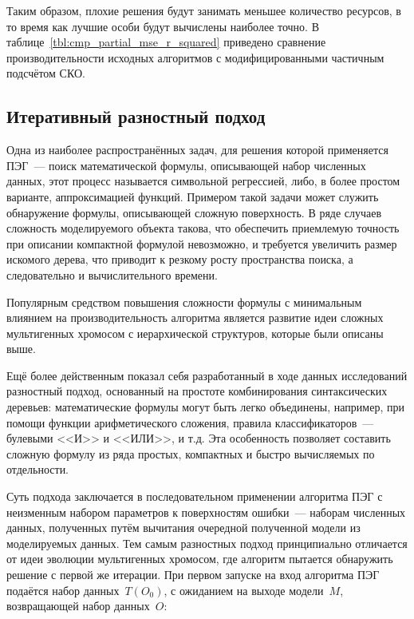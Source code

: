 Таким образом, плохие решения будут занимать меньшее количество ресурсов, в то время как лучшие особи будут вычислены наиболее точно. В таблице~\ref{tbl:cmp_partial_mse_r_squared} приведено сравнение производительности исходных алгоритмов с модифицированными частичным подсчётом СКО.






\subsection{Итеративный разностный подход}

Одна из наиболее распространённых задач, для решения которой применяется ПЭГ~--- поиск математической формулы, описывающей набор численных данных, этот процесс называется символьной регрессией, либо, в более простом варианте, аппроксимацией функций. Примером такой задачи может служить обнаружение формулы, описывающей сложную поверхность. В ряде случаев сложность моделируемого объекта такова, что обеспечить приемлемую точность при описании компактной формулой невозможно, и требуется увеличить размер искомого дерева, что приводит к резкому росту пространства поиска, а следовательно и вычислительного времени.

Популярным средством повышения сложности формулы с минимальным влиянием на производительность алгоритма является развитие идеи сложных мультигенных хромосом с иерархической структуров, которые были описаны выше.

Ещё более действенным показал себя разработанный в ходе данных исследований разностный подход, основанный на простоте комбинирования синтаксических деревьев: математические формулы могут быть легко объединены, например, при помощи функции арифметического сложения, правила классификаторов~--- булевыми <<И>> и <<ИЛИ>>, и т.д. Эта особенность позволяет составить сложную формулу из ряда простых, компактных и быстро вычисляемых по отдельности.

Суть подхода заключается в последовательном применении алгоритма ПЭГ с неизменным набором параметров к поверхностям ошибки~--- наборам численных данных, полученных путём вычитания очередной полученной модели из моделируемых данных. Тем самым разностных подход принципиально отличается от идеи эволюции мультигенных хромосом, где алгоритм пытается обнаружить решение с первой же итерации. При первом запуске на вход алгоритма ПЭГ подаётся набор данных~$T(O_{0})$, с ожиданием на выходе модели~$M$, возвращающей набор данных~$O$:

